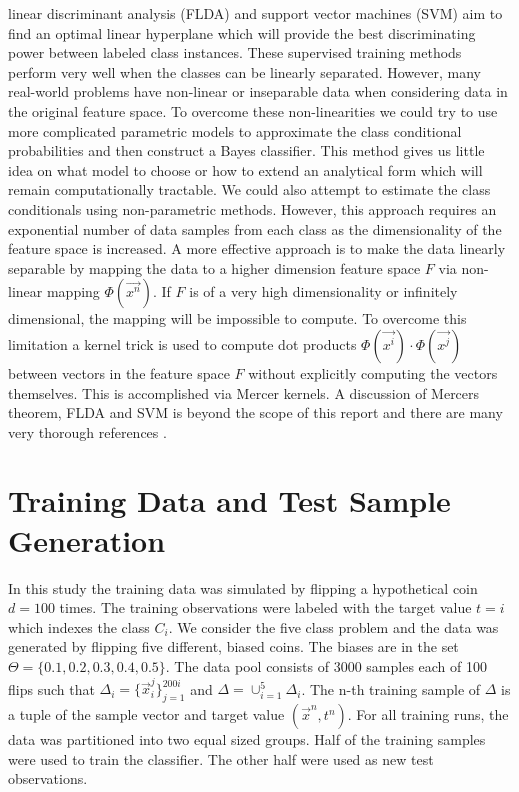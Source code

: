 \documentclass[journal]{IEEEtran}
\begin{document}
 linear discriminant analysis (FLDA) and support vector machines (SVM) aim to find an optimal linear hyperplane which will provide the best discriminating power between labeled class instances. These supervised training methods perform very well when the classes can be linearly separated. However, many real-world problems have non-linear or inseparable data when considering data in the original feature space. To overcome these non-linearities we could try to use more complicated parametric models to approximate the class conditional probabilities and then construct a Bayes classifier. This method gives us little idea on what model to choose or how to extend an analytical form which will remain computationally tractable. We could also attempt to estimate the class conditionals using non-parametric methods. However, this approach requires an exponential number of data samples from each class as the dimensionality of the feature space is increased. A more effective approach is to make the data linearly separable by mapping the data to a higher dimension feature space \(F\) via non-linear mapping \(\Phi(\vec{x^n})\). If \(F\) is of a very high dimensionality or infinitely dimensional, the mapping will be impossible to compute. To overcome this limitation a kernel trick is used to compute dot products \(\Phi(\vec{x^i})\cdot\Phi(\vec{x^j})\) between vectors in the feature space \(F\) without explicitly computing the vectors themselves. This is accomplished via Mercer kernels\cite{mercer}\cite{mika}. A discussion of Mercers theorem, FLDA and SVM is beyond the scope of this report and there are many very thorough references \cite{alpaydin}\cite{chang2}\cite{mercer}.

\section{Training Data and Test Sample Generation}
\par In this study the training data was simulated by flipping a hypothetical coin \(d=100\) times. The training observations were labeled with the target value \(t = i\) which indexes the class \(C_i\). We consider the five class problem and the data was generated by flipping five different, biased coins. The biases are in the set \(\Theta = \{0.1, 0.2, 0.3, 0.4, 0.5\}\). The data pool consists of 3000 samples each of 100 flips such that \(\Delta_i = \{\vec{x}_i^j\}_{j=1}^{200i}\) and \(\Delta = \cup_{i=1}^5{\Delta_i}\). The n-th training sample of \(\Delta\) is a tuple of the sample vector and target value \((\vec{x}^n, t^n)\). For all training runs, the data was partitioned into two equal sized groups. Half of the training samples were used to train the classifier. The other half were used as new test observations.
\end{document}
